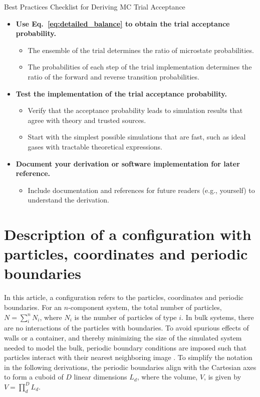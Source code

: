 \documentclass[
  9pt,
  bestpractices,
]{livecoms}
\begin{document}
\begin{Checklists*}[p!]
\begin{checklist}{Best Practices Checklist for Deriving MC Trial Acceptance}
\begin{itemize}
\item
  \textbf{Use Eq.~\ref{eq:detailed_balance} to obtain the trial acceptance probability.}
  \begin{itemize}
    \item The ensemble of the trial determines the ratio of microstate probabilities.
    \item The probabilities of each step of the trial implementation determines the ratio of the forward and reverse transition probabilities.
  \end{itemize}

\item
  \textbf{Test the implementation of the trial acceptance probability.}
  \begin{itemize}
    \item Verify that the acceptance probability leads to simulation results that agree with theory and trusted sources.
    \item Start with the simplest possible simulations that are fast, such as ideal gases with tractable theoretical expressions.
  \end{itemize}

\item
  \textbf{Document your derivation or software implementation for later reference.}
  \begin{itemize}
    \item Include documentation and references for future readers (e.g., yourself) to understand the derivation.
  \end{itemize}

\end{itemize}
\end{checklist}
\end{Checklists*}


\section{\label{sec:configuration}Description of a configuration with particles, coordinates and periodic boundaries}

In this article, a configuration refers to the particles, coordinates and periodic boundaries.
For an $n$-component system, the total number of particles, $N=\sum_{i}^{n} N_i$, where $N_i$ is the number of particles of type $i$.
In bulk systems, there are no interactions of the particles with boundaries.
To avoid spurious effects of walls or a container, and thereby minimizing the size of the simulated system needed to model the bulk, periodic boundary conditions are imposed such that particles interact with their nearest neighboring image \cite{allen_computer_1989}.
To simplify the notation in the following derivations, the periodic boundaries align with the Cartesian axes to form a cuboid of $D$ linear dimensions $L_d$, where the volume, $V$, is given by $V=\prod_d^D L_d$.
\end{document}
